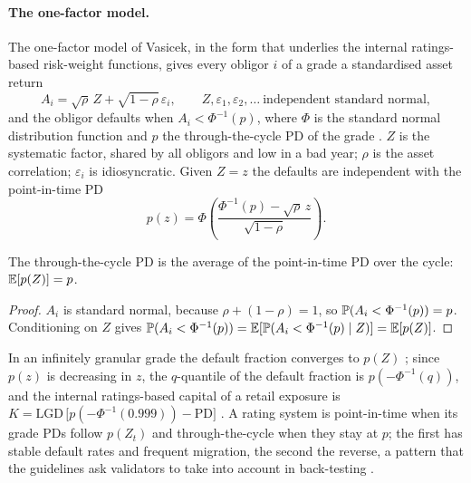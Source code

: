 \paragraph{The one-factor model.} The one-factor model of Vasicek, in the form that underlies the internal ratings-based risk-weight functions, gives every obligor $i$ of a grade a standardised asset return
\begin{equation}
A_i = \sqrt{\rho}\,Z + \sqrt{1-\rho}\,\varepsilon_i,\qquad Z,\varepsilon_1,\varepsilon_2,\dots\ \text{independent standard normal},
\label{eq:ratings-asset}
\end{equation}
and the obligor defaults when $A_i<\Phi^{-1}(p)$, where $\Phi$ is the standard normal distribution function and $p$ the through-the-cycle PD of the grade \citep{ratings:vasicek2002,ratings:gordy2003}. $Z$ is the systematic factor, shared by all obligors and low in a bad year; $\rho$ is the asset correlation; $\varepsilon_i$ is idiosyncratic. Given $Z=z$ the defaults are independent with the point-in-time PD
\begin{equation}
p(z)=\Phi\!\left(\frac{\Phi^{-1}(p)-\sqrt{\rho}\,z}{\sqrt{1-\rho}}\right).
\label{eq:ratings-pit}
\end{equation}
\begin{proposition}\label{prop:ratings-ttc}
The through-the-cycle PD is the average of the point-in-time PD over the cycle: $\mathbb{E}[p(Z)]=p$.
\end{proposition}
\begin{proof}
$A_i$ is standard normal, because $\rho+(1-\rho)=1$, so $\mathbb{P}(A_i<\Phi^{-1}(p))=p$. Conditioning on $Z$ gives $\mathbb{P}(A_i<\Phi^{-1}(p))=\mathbb{E}[\mathbb{P}(A_i<\Phi^{-1}(p)\mid Z)]=\mathbb{E}[p(Z)]$.
\end{proof}
In an infinitely granular grade the default fraction converges to $p(Z)$ \citep{ratings:vasicek1991,ratings:gordy2003}; since $p(z)$ is decreasing in $z$, the $q$-quantile of the default fraction is $p(-\Phi^{-1}(q))$, and the internal ratings-based capital of a retail exposure is $K=\mathrm{LGD}\,\bigl[p(-\Phi^{-1}(0.999))-\mathrm{PD}\bigr]$ \citep{ratings:bcbs2005}. A rating system is point-in-time when its grade PDs follow $p(Z_t)$ and through-the-cycle when they stay at $p$; the first has stable default rates and frequent migration, the second the reverse, a pattern that the guidelines ask validators to take into account in back-testing \citep{ratings:eba2017,ratings:carlehed2012,ratings:forest2013}.

